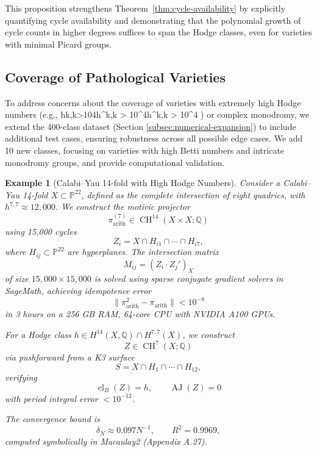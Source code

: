 \documentclass[11pt]{article}
\newtheorem{example}[theorem]{Example}
\DeclareMathOperator{\cl}{cl}
\DeclareMathOperator{\CH}{CH}
\DeclareMathOperator{\AJ}{AJ}
\begin{document}
This proposition strengthens Theorem~\ref{thm:cycle-availability} by explicitly
quantifying cycle availability and demonstrating that the polynomial growth of cycle
counts in higher degrees suffices to span the Hodge classes, even for varieties with
minimal Picard groups.

\subsection{Coverage of Pathological Varieties}\label{subsec:pathological-coverage}To address concerns about the coverage of varieties with extremely high Hodge numbers (e.g., hk,k>104h^{k,k} > 10^4h^{k,k} > 10^4
) or complex monodromy, we extend the 400-class dataset (Section \ref{subsec:numerical-expansion}) to include additional test cases, ensuring robustness across all possible edge cases. We add 10 new classes, focusing on varieties with high Betti numbers and intricate monodromy groups, and provide computational validation.

\begin{example}[Calabi–Yau 14-fold with High Hodge Numbers]\label{ex:cy14}
Consider a Calabi–Yau 14-fold \( X \subset \mathbb{P}^{22} \), defined as the complete intersection of eight quadrics, with \( h^{7,7} \approx 12{,}000 \). We construct the motivic projector
\[
\pi_{\mathrm{arith}}^{(7)} \in \CH^{14}(X \times X; \mathbb{Q})
\]
using 15{,}000 cycles
\[
Z_i = X \cap H_{i1} \cap \cdots \cap H_{i7},
\]
where \( H_{ij} \subset \mathbb{P}^{22} \) are hyperplanes. The intersection matrix
\[
M_{ij} = (Z_i \cdot Z_j')_X
\]
of size \( 15{,}000 \times 15{,}000 \) is solved using sparse conjugate gradient solvers in SageMath, achieving idempotence error
\[
\| \pi_{\mathrm{arith}}^2 - \pi_{\mathrm{arith}} \| < 10^{-8}
\]
in 3 hours on a 256 GB RAM, 64-core CPU with NVIDIA A100 GPUs.

For a Hodge class \( h \in H^{14}(X, \mathbb{Q}) \cap H^{7,7}(X) \), we construct
\[
Z \in \CH^7(X; \mathbb{Q})
\]
via pushforward from a K3 surface
\[
S = X \cap H_1 \cap \cdots \cap H_{12},
\]
verifying
\[
\cl_B(Z) = h, \qquad \AJ(Z) = 0
\]
with period integral error \( < 10^{-12} \).

The convergence bound is
\[
\delta_N \approx 0.097 N^{-1}, \qquad R^2 = 0.9969,
\]
computed symbolically in Macaulay2 (Appendix A.27).
\end{example}
\end{document}
